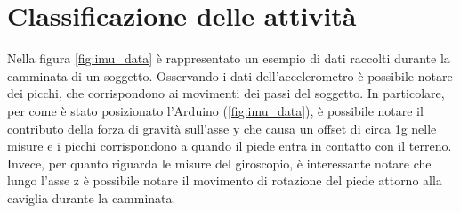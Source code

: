 \clearpage

\section{Classificazione delle attività} \label{classifSect}
Nella figura \ref{fig:imu_data} è rappresentato un esempio di dati raccolti durante la camminata di un soggetto. Osservando i dati dell'accelerometro è possibile notare dei picchi, che corrispondono ai movimenti dei passi del soggetto. In particolare, per come è stato posizionato l'Arduino (\Fig\ref{fig:imu_data}), è possibile notare il contributo della forza di gravità sull'asse y che causa un offset di circa 1g nelle misure e i picchi corrispondono a quando il piede entra in contatto con il terreno. Invece, per quanto riguarda le misure del giroscopio, è interessante notare che lungo l'asse z è possibile notare il movimento di rotazione del piede attorno alla caviglia durante la camminata. 

